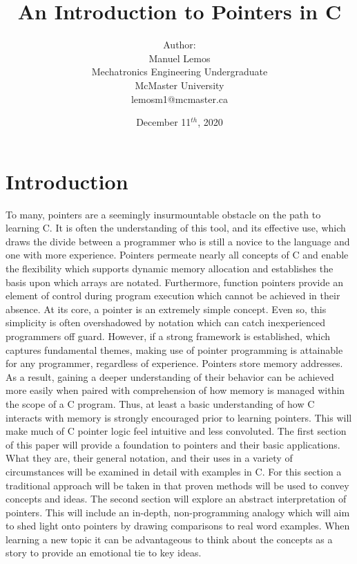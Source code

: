 \documentclass[two column, 10pt]{article}
\title{An Introduction to Pointers in C}
\author{Author:\\Manuel Lemos\\Mechatronics Engineering Undergraduate \\
McMaster University\\lemosm1@mcmaster.ca}
\date{December 11$^{th}$, 2020}
\begin{document}
\maketitle


\section{Introduction}
To many, pointers are a seemingly insurmountable obstacle on the path to learning C. It is often the understanding of this tool, and its effective use, which draws the divide between a programmer who is still a novice to the language and one with more experience. 
Pointers permeate nearly all concepts of C and enable the flexibility which supports dynamic memory allocation and establishes the basis upon which arrays are notated. Furthermore, function pointers provide an element of control during program execution which cannot be achieved in their absence\cite{Standish}. 
At its core, a pointer is an extremely simple concept. Even so, this simplicity is often overshadowed by notation which can catch inexperienced programmers off guard. However, if a strong framework is established, which captures fundamental themes, making use of pointer programming is attainable for any programmer, regardless of experience.
Pointers store memory addresses. As a result, gaining a deeper understanding of their behavior can be achieved more easily when paired with comprehension of how memory is managed within the scope of a C program. Thus, at least a basic understanding of how C interacts with memory is strongly encouraged prior to learning pointers. This will make much of C pointer logic feel intuitive and less convoluted. 
The first section of this paper will provide a foundation to pointers and their basic applications. What they are, their general notation, and their uses in a variety of circumstances will be examined in detail with examples in C. For this section a traditional approach will be taken in that proven methods will be used to convey concepts and ideas. 
The second section will explore an abstract interpretation of pointers. This will include an in-depth, non-programming analogy which will aim to shed light onto pointers by drawing comparisons to real word examples. When learning a new topic it can be advantageous to think about the concepts as a story to provide an emotional tie to key ideas.
\end{document}
